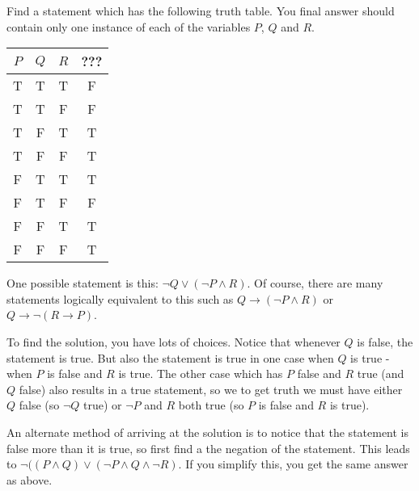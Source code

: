 \documentclass[11pt]{exam}
\def\and{\wedge}
\def\imp{\rightarrow}
\begin{document}
\begin{questions}
\question[4] Find a statement which has the following truth table.  You final answer should contain only one instance of each of the variables $P$, $Q$ and $R$.

\begin{center}
  \begin{tabular}{c|c|c||c}
    $P$ & $Q$ & $R$ & ???\\ \hline
    T & T & T & F \\
    T & T & F & F \\
    T & F & T & T \\
    T & F & F & T \\
    F & T & T & T \\
    F & T & F & F \\
    F & F & T & T \\
    F & F & F & T
  \end{tabular}
\end{center}
\begin{solution}
  One possible statement is this: $\neg Q \vee (\neg P \and R)$.  Of course, there are many statements logically equivalent to this such as $Q \imp (\neg P \and R)$ or $Q \imp \neg(R \imp P)$.  
  
  To find the solution, you have lots of choices.  Notice that whenever $Q$ is false, the statement is true.  But also the statement is true in one case when $Q$ is true - when $P$ is false and $R$ is true.  The other case which has $P$ false and $R$ true (and $Q$ false) also results in a true statement, so we to get truth we must have either $Q$ false (so $\neg Q$ true) or $\neg P$ and $R$ both true (so $P$ is false and $R$ is true).
  
  An alternate method of arriving at the solution is to notice that the statement is false more than it is true, so first find a the negation of the statement.  This leads to $\neg ((P \and Q) \vee (\neg P \and Q \and \neg R)$.  If you simplify this, you get the same answer as above.
\end{solution}


\end{questions}
\end{document}
